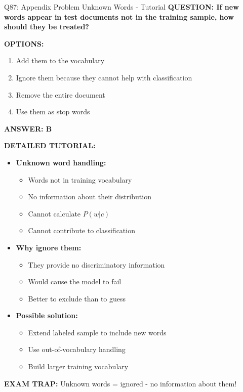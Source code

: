 \documentclass[8pt]{beamer}
\begin{document}
	\begin{frame}{Q87: Appendix Problem Unknown Words - Tutorial}
		\fontsize{6.5}{7.5}\selectfont
		\textbf{QUESTION: If new words appear in test documents not in the training sample, how should they be treated?}
		
		\vspace{0.1cm}
		\textbf{OPTIONS:}
		\begin{enumerate}
			\item Add them to the vocabulary
			\item Ignore them because they cannot help with classification
			\item Remove the entire document
			\item Use them as stop words
		\end{enumerate}
		
		\vspace{0.1cm}
		\textcolor{myblue}{\textbf{ANSWER: B}}
		
		\vspace{0.1cm}
		\textbf{DETAILED TUTORIAL:}
		\begin{itemize}
			\item \textbf{Unknown word handling:}
			\begin{itemize}
				\item Words not in training vocabulary
				\item No information about their distribution
				\item Cannot calculate $P(w|c)$
				\item Cannot contribute to classification
			\end{itemize}
			\item \textbf{Why ignore them:}
			\begin{itemize}
				\item They provide no discriminatory information
				\item Would cause the model to fail
				\item Better to exclude than to guess
			\end{itemize}
			\item \textbf{Possible solution:}
			\begin{itemize}
				\item Extend labeled sample to include new words
				\item Use out-of-vocabulary handling
				\item Build larger training vocabulary
			\end{itemize}
		\end{itemize}
		
		\textcolor{myred}{\textbf{EXAM TRAP:}} Unknown words = \textcolor{myblue}{ignored} - no information about them!
	\end{frame}
	
\end{document}
